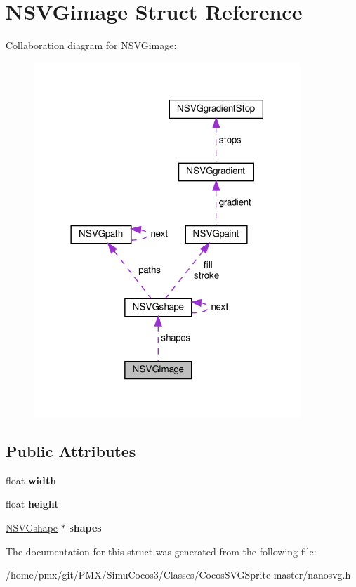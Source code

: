 \hypertarget{structNSVGimage}{}\section{N\+S\+V\+Gimage Struct Reference}
\label{structNSVGimage}


Collaboration diagram for N\+S\+V\+Gimage\+:
\nopagebreak
\begin{figure}[H]
\begin{center}
\leavevmode
\includegraphics[width=285pt]{structNSVGimage__coll__graph}
\end{center}
\end{figure}
\subsection*{Public Attributes}
\begin{DoxyCompactItemize}
\item 
\mbox{\label{structNSVGimage_a09e04e73bf36578099e2f678494aba64}} 
float {\bfseries width}
\item 
\mbox{\label{structNSVGimage_a1940399638cc3a962fa9255c10e3daf4}} 
float {\bfseries height}
\item 
\mbox{\label{structNSVGimage_a6958d5d3606f57ab700ff3ba1372205a}} 
\hyperlink{structNSVGshape}{N\+S\+V\+Gshape} $\ast$ {\bfseries shapes}
\end{DoxyCompactItemize}


The documentation for this struct was generated from the following file\+:\begin{DoxyCompactItemize}
\item 
/home/pmx/git/\+P\+M\+X/\+Simu\+Cocos3/\+Classes/\+Cocos\+S\+V\+G\+Sprite-\/master/nanosvg.\+h\end{DoxyCompactItemize}
